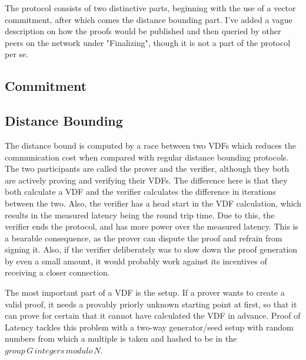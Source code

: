 The protocol consists of two distinctive parts, beginning with the use of a vector commitment, after which comes the distance bounding part. I've added a vague description on how the proofs would be published and then queried by other peers on the network under "Finalizing", though it is not a part of the protocol per se.

\subsection{Commitment}


\subsection{Distance Bounding}
The distance bound is computed by a race between two VDFs which reduces the communication cost when compared with regular distance bounding protocols. The two participants are called the prover and the verifier, although they both are actively proving and verifying their VDFs. The difference here is that they both calculate a VDF and the verifier calculates the difference in iterations between the two. Also, the verifier has a head start in the VDF calculation, which results in the measured latency being the round trip time. Due to this, the verifier ends the protocol, and has more power over the measured latency. This is a bearable consequence, as the prover can dispute the proof and refrain from signing it. Also, if the verifier deliberately was to slow down the proof generation by even a small amount, it would probably work against its incentives of receiving a closer connection.

The most important part of a VDF is the setup. If a prover wants to create a valid proof, it needs a provably priorly unknown starting point at first, so that it can prove for certain that it cannot have calculated the VDF in advance. Proof of Latency tackles this problem with a two-way generator/seed setup with random numbers from which a multiple is taken and hashed to be in the \(group\, G\, integers\, modulo\, N\).

